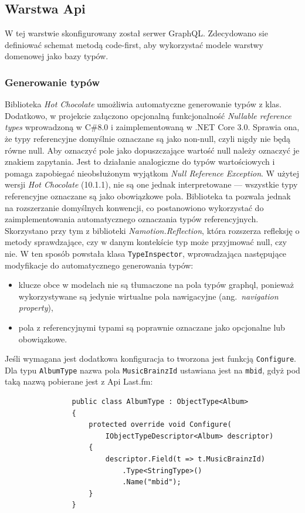 	\subsection{Warstwa Api}
		W tej warstwie skonfigurowany został serwer GraphQL.
		Zdecydowano sie definiować schemat metodą code-first, aby wykorzystać modele warstwy domenowej jako bazy typów.

		\subsubsection*{Generowanie typów}
			Biblioteka \emph{Hot Chocolate} umożliwia automatyczne generowanie typów z klas.
			Dodatkowo, w projekcie załączono opcjonalną funkcjonalność \emph{Nullable reference types} wprowadzoną w C\#8.0 i zaimplementowaną w .NET Core 3.0.
			Sprawia ona, że typy referencyjne domyślnie oznaczane są jako non-null, czyli nigdy nie będą równe null.
			Aby oznaczyć pole jako dopuszczające wartość null należy oznaczyć je znakiem zapytania.
			Jest to działanie analogiczne do typów wartościowych i pomaga zapobiegać nieobsłużonym wyjątkom \emph{Null Reference Exception}.
			W użytej wersji \emph{Hot Chocolate} (10.1.1), nie są one jednak interpretowane --- wszystkie typy referencyjne oznaczane są jako obowiązkowe pola.
			Biblioteka ta pozwala jednak na rozszerzanie domyślnych konwencji, co postanowiono wykorzystać do zaimplementowania automatycznego oznaczania typów referencyjnych.
			Skorzystano przy tym z biblioteki \emph{Namotion.Reflection}, która rozszerza refleksję o metody sprawdzające, czy w danym kontekście typ może przyjmować null, czy nie.
			W ten sposób powstała klasa \verb|TypeInspector|, wprowadzająca następujące modyfikacje do automatycznego generowania typów:
			\begin{itemize}
				\item klucze obce w modelach nie są tłumaczone na pola typów graphql, ponieważ wykorzystywane są jedynie wirtualne pola nawigacyjne (ang.\ \emph{navigation property}),
				\item pola z referencyjnymi typami są poprawnie oznaczane jako opcjonalne lub obowiązkowe.
			\end{itemize}

			Jeśli wymagana jest dodatkowa konfiguracja to tworzona jest funkcją \verb|Configure|.
			Dla typu \verb|AlbumType| nazwa pola \verb|MusicBrainzId| ustawiana jest na \verb|mbid|, gdyż pod taką nazwą pobierane jest z Api Last.fm:
			\begin{lstlisting}
				public class AlbumType : ObjectType<Album>
				{
					protected override void Configure(
						IObjectTypeDescriptor<Album> descriptor)
					{
						descriptor.Field(t => t.MusicBrainzId)
							.Type<StringType>()
							.Name("mbid");
					}
				}
			\end{lstlisting}

